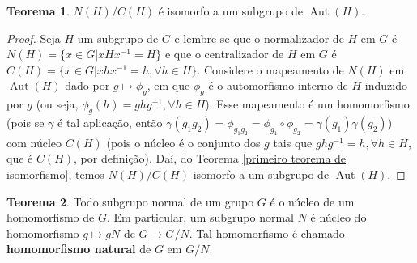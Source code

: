 \documentclass[a4paper,portuguese,11pt,twoside, leqno]{book}
\DeclareMathOperator{\aut}{Aut}
\theoremstyle{definition}
\newtheorem{theorem}{Teorema}[section]
\begin{document}
	\begin{theorem}
		\label{normalizador centralizador}
		$N(H)/C(H)$ é isomorfo a um subgrupo de $\aut(H)$. 
	\end{theorem}
	
	\begin{proof}
		Seja $H$ um subgrupo de $G$ e lembre-se que o normalizador de $H$ em $G$ é $N(H) = \{ x\in G| xHx^{-1} = H \}$ e que o centralizador de $H$ em $G$ é $C(H) = \{ x\in G| xhx^{-1} = h, \forall h\in H \}$. Considere o mapeamento de $N(H)$ em $\aut(H)$ dado por $g\mapsto \phi_g$, em que $\phi_g$ é o automorfismo interno de $H$ induzido por $g$ (ou seja, $\phi_g(h) = ghg^{-1}, \forall h\in H$). Esse mapeamento é um homomorfismo (pois se $\gamma$ é tal aplicação, então $\gamma(g_1g_2) = \phi_{g_1g_2} = \phi_{g_1}\circ\phi_{g_2} = \gamma(g_1)\gamma(g_2)$) com núcleo $C(H)$ (pois o núcleo é o conjunto dos $g$ tais que $ghg^{-1} = h, \forall h\in H$, que é $C(H)$, por definição). Daí, do Teorema \eqref{primeiro teorema de isomorfismo}, temos $N(H)/C(H)$ isomorfo a um subgrupo de $\aut(H)$.
	\end{proof}
	
	\begin{theorem}
		\label{subgrupos normais e nucleos}
		Todo subgrupo normal de um grupo $G$ é o núcleo de um homomorfismo de $G$. Em particular, um subgrupo normal $N$ é núcleo do homomorfismo $g\mapsto gN$ de $G\to G/N$. Tal homomorfismo é chamado \textbf{homomorfismo natural} de $G$ em $G/N$.
	\end{theorem}
	
\end{document}
